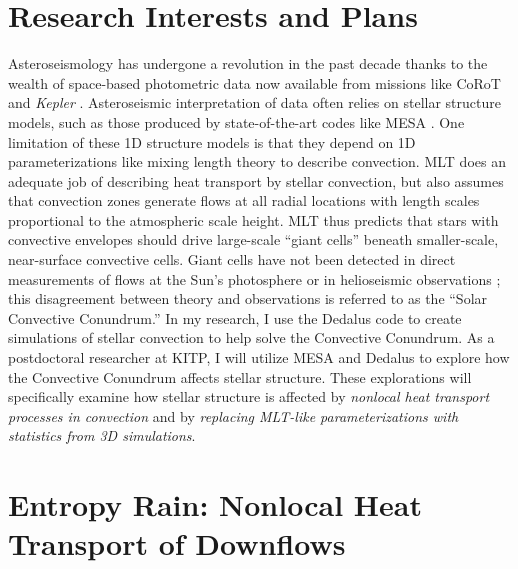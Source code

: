 \documentclass[preprint, hmargin=1in, vmargin=1in]{aastex62}
\begin{document}
\maketitle
\vspace{-88pt}
\section*{\textbf{Research Interests and Plans}}
\thispagestyle{fancy}
Asteroseismology has undergone a revolution in the past decade thanks to the wealth of space-based photometric data now available from missions like CoRoT and \emph{Kepler} \citep{huber&all2019}.
Asteroseismic interpretation of data often relies on stellar structure models, such as those produced by state-of-the-art codes like MESA \citep[e.g.,][]{paxton&all2011, paxton&all2019}.
One limitation of these 1D structure models is that they depend on 1D parameterizations like mixing length theory \citep[MLT,][]{bohm-vitense1958} to describe convection.
MLT does an adequate job of describing heat transport by stellar convection, but also assumes that convection zones generate flows at all radial locations with length scales proportional to the atmospheric scale height.
MLT thus predicts that stars with convective envelopes should drive large-scale ``giant cells'' beneath smaller-scale, near-surface convective cells. 
Giant cells have not been detected in direct measurements of flows at the Sun's photosphere \citep{hathaway&all2015} or in helioseismic observations \citep{hanasoge&all2015}; this disagreement between theory and observations is referred to as the ``Solar Convective Conundrum.''
In my research, I use the Dedalus code \citep{burns&all2019} to create simulations of stellar convection to help solve the Convective Conundrum.
As a postdoctoral researcher at KITP, I will utilize MESA and Dedalus to explore how the Convective Conundrum affects stellar structure.
These explorations will specifically examine how stellar structure is affected by \emph{nonlocal heat transport processes in convection} and by \emph{replacing MLT-like parameterizations with statistics from 3D simulations}.

\section*{\textbf{Entropy Rain: Nonlocal Heat Transport of Downflows}}
\end{document}
